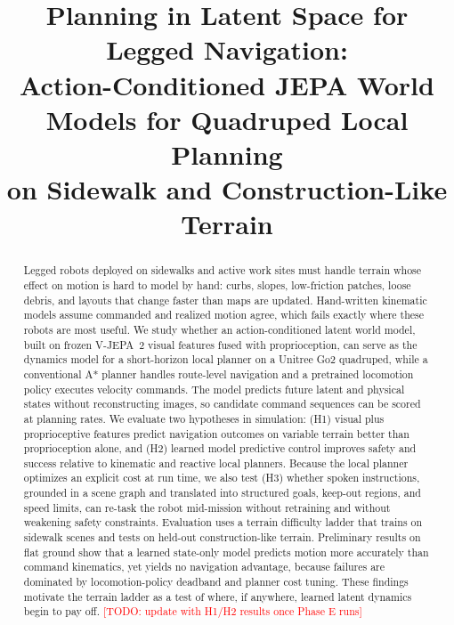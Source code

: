 \documentclass[conference]{IEEEtran}
\newcommand{\todo}[1]{\textcolor{red}{[TODO: #1]}}
\begin{document}
\title{Planning in Latent Space for Legged Navigation:\\
Action-Conditioned JEPA World Models for Quadruped Local Planning\\
on Sidewalk and Construction-Like Terrain}

\author{
\IEEEauthorblockA{University of Colorado Denver\\
\todo{email / co-authors / advisor}}}

\maketitle

\begin{abstract}
Legged robots deployed on sidewalks and active work sites must handle
terrain whose effect on motion is hard to model by hand: curbs, slopes,
low-friction patches, loose debris, and layouts that change faster than
maps are updated. Hand-written kinematic models assume commanded and
realized motion agree, which fails exactly where these robots are most
useful. We study whether an action-conditioned latent world model,
built on frozen V-JEPA~2 visual features fused with proprioception, can
serve as the dynamics model for a short-horizon local planner on a
Unitree Go2 quadruped, while a conventional A* planner handles
route-level navigation and a pretrained locomotion policy executes
velocity commands. The model predicts future latent and physical states
without reconstructing images, so candidate command sequences can be
scored at planning rates. We evaluate two hypotheses in simulation:
(H1) visual plus proprioceptive features predict navigation outcomes on
variable terrain better than proprioception alone, and (H2) learned
model predictive control improves safety and success relative to
kinematic and reactive local planners. Because the local planner
optimizes an explicit cost at run time, we also test (H3) whether
spoken instructions, grounded in a scene graph and translated into
structured goals, keep-out regions, and speed limits, can re-task the
robot mid-mission without retraining and without weakening safety
constraints. Evaluation uses a terrain
difficulty ladder that trains on sidewalk scenes and tests on held-out
construction-like terrain. Preliminary results on flat ground show that
a learned state-only model predicts motion more accurately than command
kinematics, yet yields no navigation advantage, because failures are
dominated by locomotion-policy deadband and planner cost tuning. These
findings motivate the terrain ladder as a test of where, if anywhere,
learned latent dynamics begin to pay off.
\todo{update with H1/H2 results once Phase E runs}
\end{abstract}
\end{document}

